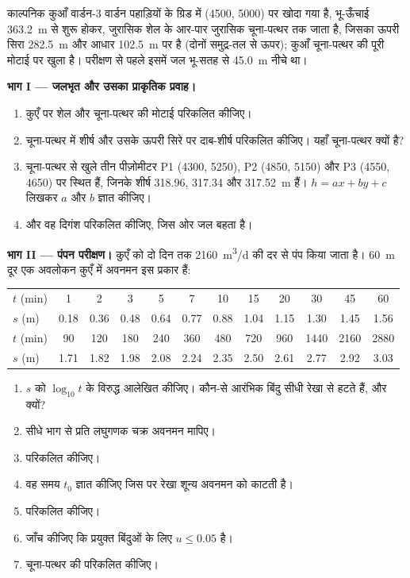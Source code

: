\begin{problem}[{सप्ताहांत समस्या --- जलीय शीर्ष, एक पंपन परीक्षण और
परिरुद्ध वार्डन पहाड़ियों के चूना-पत्थर में एक प्रदूषक की यात्रा}]
\label{pb:b3:hydrogeology:1}
काल्पनिक कुआँ वार्डन-3 वार्डन पहाड़ियों के ग्रिड में (4500, 5000) पर खोदा गया है,
भू-ऊँचाई \qty{363.2}{m} से शुरू होकर, जुरासिक शेल के आर-पार
जुरासिक चूना-पत्थर तक जाता है, जिसका ऊपरी सिरा
\qty{282.5}{m} और आधार \qty{102.5}{m} पर है (दोनों समुद्र-तल से ऊपर); कुआँ चूना-पत्थर की
पूरी मोटाई पर खुला है। परीक्षण से पहले इसमें जल
भू-सतह से \qty{45.0}{m} नीचे था।

\medskip\noindent\textbf{भाग I --- जलभृत और उसका प्राकृतिक प्रवाह।}
\begin{enumerate}
\item कुएँ पर शेल और चूना-पत्थर की मोटाई परिकलित कीजिए।
\item चूना-पत्थर में शीर्ष और उसके ऊपरी सिरे पर दाब-शीर्ष परिकलित कीजिए।
  यहाँ चूना-पत्थर  क्यों है?
\item चूना-पत्थर से खुले तीन पीज़ोमीटर P1 (4300, 5250), P2
  (4850, 5150) और P3 (4550, 4650) पर स्थित हैं, जिनके शीर्ष 318.96, 317.34 और
  \qty{317.52}{m} हैं। $h = ax + by + c$ लिखकर $a$ और $b$ ज्ञात कीजिए।
\item {} और वह दिगंश परिकलित कीजिए, जिस ओर
  जल बहता है।
\end{enumerate}

\medskip\noindent\textbf{भाग II --- पंपन परीक्षण।} कुएँ को दो दिन तक
\qty{2160}{m^3/d} की दर से पंप किया जाता है। \qty{60}{m} दूर एक अवलोकन कुएँ में
अवनमन इस प्रकार हैं:
\begin{center}
\begin{tabular}{l*{11}{c}}
\hline
$t$ (\unit{min}) & 1 & 2 & 3 & 5 & 7 & 10 & 15 & 20 & 30 & 45 & 60\\
$s$ (\unit{m}) & 0.18 & 0.36 & 0.48 & 0.64 & 0.77 & 0.88 & 1.04 & 1.15 & 1.30 & 1.45 & 1.56\\
\hline
$t$ (\unit{min}) & 90 & 120 & 180 & 240 & 360 & 480 & 720 & 960 & 1440 & 2160 & 2880\\
$s$ (\unit{m}) & 1.71 & 1.82 & 1.98 & 2.08 & 2.24 & 2.35 & 2.50 & 2.61 & 2.77 & 2.92 & 3.03\\
\hline
\end{tabular}
\end{center}
\begin{enumerate}[resume]
\item $s$ को $\log_{10}t$ के विरुद्ध आलेखित कीजिए। कौन-से आरंभिक बिंदु सीधी
  रेखा से हटते हैं, और क्यों?
\item सीधे भाग से प्रति लघुगणक चक्र अवनमन मापिए।
\item {} परिकलित कीजिए।
\item वह समय $t_0$ ज्ञात कीजिए जिस पर रेखा शून्य अवनमन को काटती है।
\item {} परिकलित कीजिए।
\item जाँच कीजिए कि प्रयुक्त बिंदुओं के लिए $u \le 0.05$ है।
\item चूना-पत्थर की  परिकलित कीजिए।
\end{enumerate}


\end{problem}
